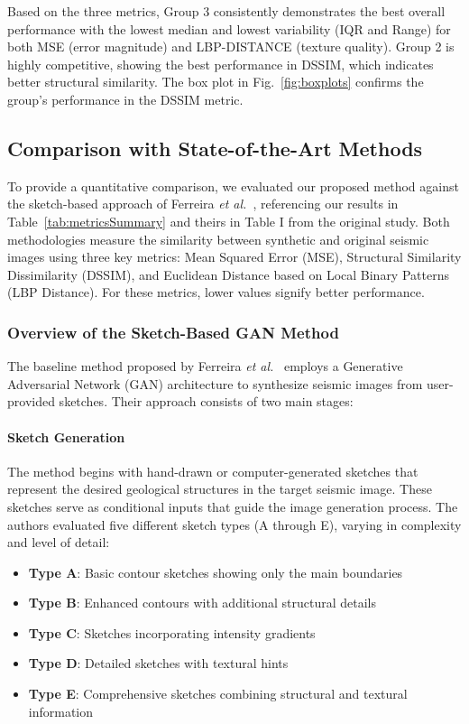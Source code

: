 \documentclass{ieeeaccess}
\begin{document}
Based on the three metrics, Group 3 consistently demonstrates the best overall performance with the lowest median and lowest variability (IQR and Range) for both MSE (error magnitude) and LBP-DISTANCE (texture quality). Group 2 is highly competitive, showing the best performance in DSSIM, which indicates better structural similarity. The box plot in Fig.~\ref{fig:boxplots} confirms the group's performance in the DSSIM metric.

\subsection{Comparison with State-of-the-Art Methods}

To provide a quantitative comparison, we evaluated our proposed method against the sketch-based approach of Ferreira \emph{et al.}~\cite{Ferreira2020}, referencing our results in Table~\ref{tab:metricsSummary} and theirs in Table I from the original study. Both methodologies measure the similarity between synthetic and original seismic images using three key metrics: Mean Squared Error (MSE), Structural Similarity Dissimilarity (DSSIM), and Euclidean Distance based on Local Binary Patterns (LBP Distance). For these metrics, lower values signify better performance.

\subsubsection{Overview of the Sketch-Based GAN Method}

The baseline method proposed by Ferreira \emph{et al.}~\cite{Ferreira2020} employs a Generative Adversarial Network (GAN) architecture to synthesize seismic images from user-provided sketches. Their approach consists of two main stages:

\paragraph{Sketch Generation} The method begins with hand-drawn or computer-generated sketches that represent the desired geological structures in the target seismic image. These sketches serve as conditional inputs that guide the image generation process. The authors evaluated five different sketch types (A through E), varying in complexity and level of detail:
\begin{itemize}
    \item \textbf{Type A}: Basic contour sketches showing only the main boundaries
    \item \textbf{Type B}: Enhanced contours with additional structural details
    \item \textbf{Type C}: Sketches incorporating intensity gradients
    \item \textbf{Type D}: Detailed sketches with textural hints
    \item \textbf{Type E}: Comprehensive sketches combining structural and textural information
\end{itemize}
\end{document}

